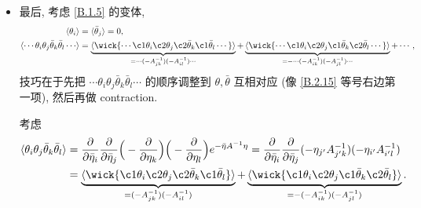 \begin{itemize}
	\item 最后, 考虑 \eqref{B.1.5} 的变体,
	\begin{align}
		\braket{\theta_i} &= \braket{\bar{\theta}_j} = 0, \\
		\braket{\cdots \theta_i \theta_j \bar{\theta}_k \bar{\theta}_l \cdots} &= \underbrace{\braket{\wick{
			\cdots \c1 \theta_i \c2 \theta_j \c2 {\bar{\theta}}_k \c1 {\bar{\theta}}_l \cdots
		}}}_{= \cdots (- A^{- 1}_{j k}) (- A^{- 1}_{i l}) \cdots} + \underbrace{\braket{\wick{
			\cdots \c1 \theta_i \c2 \theta_j \c1 {\bar{\theta}}_k \c2 {\bar{\theta}}_l \cdots
		}}}_{= - \cdots (- A^{- 1}_{i k}) (- A^{- 1}_{j l}) \cdots} + \cdots, \label{B.2.15}
	\end{align}
	技巧在于先把 $\cdots \theta_i \theta_j \bar{\theta}_k \bar{\theta}_l \cdots$ 的顺序调整到 $\theta, \bar{\theta}$ 互相对应 (像 \eqref{B.2.15} 等号右边第一项), 然后再做 contraction.
	
	\begin{tcolorbox}[title=calculation:]
		考虑
		\begin{align}
			\braket{\theta_i \theta_j \bar{\theta}_k \bar{\theta}_l} &= \frac{\partial}{\partial \bar{\eta}_i} \frac{\partial}{\partial \bar{\eta}_j} \Big( - \frac{\partial}{\partial \eta_k} \Big) \Big( - \frac{\partial}{\partial \eta_l} \Big) e^{- \bar{\eta} A^{- 1} \eta} = \frac{\partial}{\partial \bar{\eta}_i} \frac{\partial}{\partial \bar{\eta}_j} (- \eta_{j'} A^{- 1}_{j' k}) (- \eta_{i'} A^{- 1}_{i' l}) \notag \\
			&= \underbrace{\braket{\wick{
						\c1 \theta_i \c2 \theta_j \c2 {\bar{\theta}}_k \c1 {\bar{\theta}}_l
			}}}_{= (- A^{- 1}_{j k}) (- A^{- 1}_{i l})} + \underbrace{\braket{\wick{
						\c1 \theta_i \c2 \theta_j \c1 {\bar{\theta}}_k \c2 {\bar{\theta}}_l
			}}}_{= - (- A^{- 1}_{i k}) (- A^{- 1}_{j l})}.
		\end{align}
	\end{tcolorbox}
\end{itemize}
